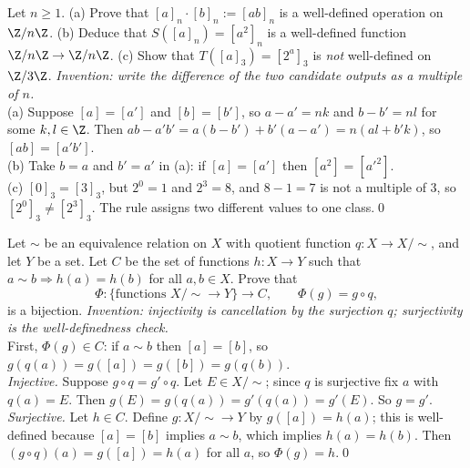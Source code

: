 \begin{bexample}
Let $n\ge1$. (a) Prove that $[a]_n\cdot[b]_n:=[ab]_n$ is a well-defined operation on $\Z/n\Z$. (b) Deduce that $S([a]_n)=[a^2]_n$ is a well-defined function $\Z/n\Z\to\Z/n\Z$. (c) Show that $T([a]_3)=[2^a]_3$ is \emph{not} well-defined on $\Z/3\Z$.
\solution
\emph{Invention: write the difference of the two candidate outputs as a multiple of $n$.}\\
(a) Suppose $[a]=[a']$ and $[b]=[b']$, so $a-a'=nk$ and $b-b'=nl$ for some $k,l\in\Z$. Then $ab-a'b'=a(b-b')+b'(a-a')=n(al+b'k)$, so $[ab]=[a'b']$.\\
(b) Take $b=a$ and $b'=a'$ in (a): if $[a]=[a']$ then $[a^2]=[a'^2]$.\\
(c) $[0]_3=[3]_3$, but $2^0=1$ and $2^3=8$, and $8-1=7$ is not a multiple of $3$, so $[2^0]_3\ne[2^3]_3$. The rule assigns two different values to one class.\qed
\end{bexample}

\begin{bexample}
Let $\sim$ be an equivalence relation on $X$ with quotient function $q:X\to X/{\sim}$, and let $Y$ be a set. Let $C$ be the set of functions $h:X\to Y$ such that $a\sim b\Rightarrow h(a)=h(b)$ for all $a,b\in X$. Prove that
\[
\Phi:\{\text{functions }X/{\sim}\to Y\}\to C,\qquad\Phi(g)=g\circ q,
\]
is a bijection.
\solution
\emph{Invention: injectivity is cancellation by the surjection $q$; surjectivity is the well-definedness check.}\\
First, $\Phi(g)\in C$: if $a\sim b$ then $[a]=[b]$, so $g(q(a))=g([a])=g([b])=g(q(b))$.\\
\emph{Injective.} Suppose $g\circ q=g'\circ q$. Let $E\in X/{\sim}$; since $q$ is surjective fix $a$ with $q(a)=E$. Then $g(E)=g(q(a))=g'(q(a))=g'(E)$. So $g=g'$.\\
\emph{Surjective.} Let $h\in C$. Define $g:X/{\sim}\to Y$ by $g([a])=h(a)$; this is well-defined because $[a]=[b]$ implies $a\sim b$, which implies $h(a)=h(b)$. Then $(g\circ q)(a)=g([a])=h(a)$ for all $a$, so $\Phi(g)=h$.\qed
\end{bexample}

